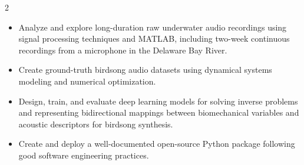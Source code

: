 \documentclass[10pt,legalpaper,ragged2e,withhyper]{altacv}
\begin{document}
\begin{paracol}{2}
\divider




\begin{itemize}
\item Analyze and explore long-duration raw underwater audio recordings using signal processing techniques and MATLAB, including two-week continuous recordings from a microphone in the Delaware Bay River.
\end{itemize}


\vspace{15pt}

\begin{itemize}
	\item Create ground-truth birdsong audio datasets using dynamical systems modeling and numerical optimization.
	
	\item Design, train, and evaluate deep learning models for solving inverse problems and representing bidirectional mappings between biomechanical variables and acoustic descriptors for birdsong synthesis.
	
	\item Create and deploy a well-documented open-source Python package following good software engineering practices.
	

\end{itemize}
\end{paracol}
\end{document}
